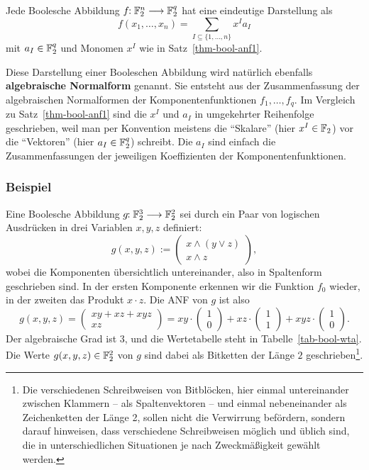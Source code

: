 \begin{refsegment}
\begin{satz}\label{thm-bool-anf3}
  Jede Boolesche Abbildung $f\!\!: \mathbb{F}_2^n \longrightarrow \mathbb{F}_2^q$ hat
  eine eindeutige Darstellung als
\[
  f(x_1,\ldots,x_n) = \sum_{I \subseteq \{1,\ldots,n\}} x^I a_I
\]
  mit $a_I \in \mathbb{F}_2^q$ und Monomen $x^I$ wie in Satz~\ref{thm-bool-anf1}.
\end{satz}
Diese Darstellung einer Booleschen
Abbildung wird natürlich ebenfalls
{\bf algebraische Normalform}
genannt.
Sie entsteht aus der Zusammenfassung der algebraischen Normalformen
der Komponentenfunktionen $f_1, \ldots, f_q$.
Im Vergleich zu Satz~\ref{thm-bool-anf1} sind die $x^I$ und $a_I$
in umgekehrter Reihenfolge geschrieben,
weil man per Konvention meistens die "`Skalare"' (hier $x^I \in \mathbb{F}_2$)
vor die "`Vektoren"' (hier $a_I \in \mathbb{F}_2^q$) schreibt.
Die $a_I$ sind einfach die Zusammenfassungen der jeweiligen Koeffizienten
der Komponentenfunktionen.

\subsubsection*{Beispiel}

Eine Boolesche Abbildung $g\!\!: \mathbb{F}_2^3 \longrightarrow \mathbb{F}_2^2$ sei
durch ein Paar von logischen Ausdrücken in drei Variablen $x, y, z$
definiert:
\[
     g(x,y,z) := \begin{pmatrix}
                    x \wedge (y \vee z) \\
                    x \wedge z
                 \end{pmatrix},
\]
wobei die Komponenten übersichtlich untereinander, also in
Spaltenform geschrieben sind.
In der ersten Komponente erkennen wir die Funktion $f_0$ wieder,
in der zweiten das Produkt $x \cdot z$. Die ANF von $g$ ist also
\[
     g(x,y,z) = \begin{pmatrix} xy + xz + xyz \\ xz \end{pmatrix}
              = xy \cdot \begin{pmatrix} 1 \\ 0 \end{pmatrix}
              + xz \cdot \begin{pmatrix} 1 \\ 1 \end{pmatrix}
              + xyz \cdot \begin{pmatrix} 1 \\ 0 \end{pmatrix}.
\]
Der algebraische Grad ist $3$, und die Wertetabelle steht in
Tabelle~\ref{tab-bool-wta}. Die Werte $g(x,y,z) \in \mathbb{F}_2^2$
von $g$ sind dabei als Bitketten der Länge $2$ geschrieben\footnote{%
  Die verschiedenen Schreibweisen von Bitblöcken,
  hier einmal untereinander
  zwischen Klammern -- als Spaltenvektoren -- und einmal nebeneinander als
  Zeichenketten der Länge 2, sollen nicht die Verwirrung befördern,
  sondern darauf hinweisen, dass verschiedene Schreibweisen möglich
  und üblich sind, die in unterschiedlichen Situationen je nach
  Zweckmäßigkeit gewählt werden.
}.


\end{refsegment}
